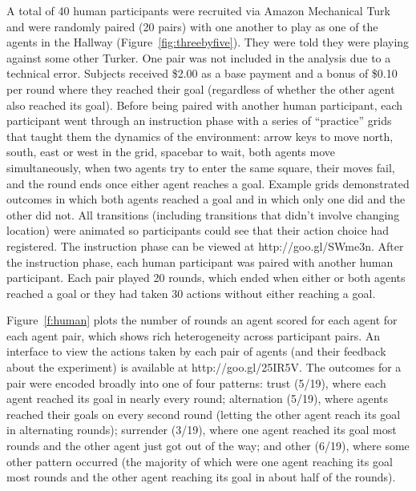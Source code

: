 \documentclass[letterpaper]{article}
\begin{document}
A total of 40 human participants were recruited via Amazon Mechanical
Turk and were randomly paired (20 pairs) with one another to play as
one of the agents in the Hallway (Figure~\ref{fig:threebyfive}). They
were told they were playing against some other Turker. One pair was
not included in the analysis due to a technical error. Subjects
received \$2.00 as a base payment and a bonus of \$0.10 per round
where they reached their goal (regardless of whether the other agent
also reached its goal). Before being paired with another human
participant, each participant went through an instruction phase with a
series of ``practice'' grids that taught them the dynamics of the
environment: arrow keys to move north, south, east or west in the
grid, spacebar to wait, both agents move simultaneously, when two
agents try to enter the same square, their moves fail, and the round
ends once either agent reaches a goal.  Example grids demonstrated
outcomes in which both agents reached a goal and in which only one did
and the other did not. All transitions (including transitions that
didn't involve changing location) were animated so participants could
see that their action choice had registered.
The instruction phase can be viewed at http://goo.gl/SWme3n. After
the instruction phase, each human participant was paired with another
human participant. Each pair played 20 rounds, which ended when either
or both agents reached a goal or they had taken 30 actions
without either reaching a goal.

Figure~\ref{f:human} plots the number of rounds an agent scored for
each agent for each agent pair, which shows rich heterogeneity across
participant pairs. An interface to view the actions taken by each pair
of agents (and their feedback about the experiment) is available at
http://goo.gl/25IR5V. The outcomes for a pair were encoded broadly
into one of four patterns: trust (5/19), where each agent reached its
goal in nearly every round; alternation (5/19), where agents reached
their goals on every second round (letting the other agent reach its
goal in alternating rounds); surrender (3/19), where one agent reached
its goal most rounds and the other agent just got out of the way; and
other (6/19), where some other pattern occurred (the majority of which
were one agent reaching its goal most rounds and the other agent
reaching its goal in about half of the rounds).
\end{document}
